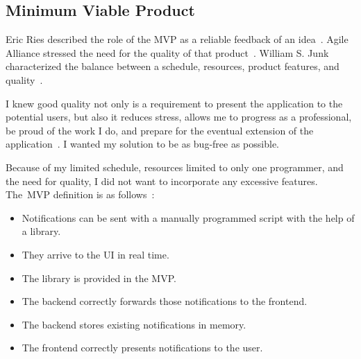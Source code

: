 \subsection{Minimum Viable Product}\label{sec:minimum-viable-product}

Eric Ries described the role of the \ac{MVP}
as a reliable feedback of an idea~\cite{ries_lean_2011}.
Agile Alliance stressed the need
for the quality of that product~\cite{foster_mvp_2022}.
William S. Junk characterized the balance between
a schedule,
resources,
product features,
and quality~\cite{junk_dynamic_2000}.

I knew good quality not only is a requirement
to present the application to the potential users,
but also it reduces stress,
allows me to progress as a professional,
be proud of the work I do,
and prepare for the eventual extension
of the application~\cite{beck_extreme_2004,foster_mvp_2022,martin_clean_2011}.
I wanted my solution to be
as bug-free as possible.

Because of my limited schedule,
resources limited to only one programmer,
and the need for quality,
I did not want to incorporate
any excessive features.
The~\acl{MVP} definition is as follows~\cite{sewera_mvp_2022}:

\begin{itemize}
  \item Notifications can be sent with a manually programmed script
        with the help of a library.
  \item They arrive to the \ac{UI} in real time.
  \item The library is provided in the \ac{MVP}.
  \item The backend correctly forwards those notifications to the frontend.
  \item The backend stores existing notifications in memory.
  \item The frontend correctly presents notifications to the user.
\end{itemize}
